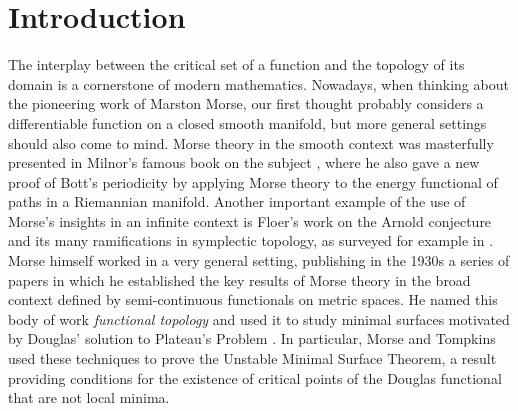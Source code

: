 
\section{Introduction}

The interplay between the critical set of a function and the topology of its domain is a cornerstone of modern mathematics.
Nowadays, when thinking about the pioneering work of Marston Morse, our first thought probably considers a differentiable function on a closed smooth manifold, but more general settings should also come to mind.
Morse theory in the smooth context was masterfully presented in Milnor's famous book on the subject \cite{MR0163331}, where he also gave a new proof of Bott's periodicity by applying Morse theory to the energy functional of paths in a Riemannian manifold.
Another important example of the use of Morse's insights in an infinite context is Floer's work on the Arnold conjecture and its many ramifications in symplectic topology, as surveyed for example in \cite{MR1702944}.
Morse himself worked in a very general setting, publishing in the 1930s a series of papers \cite{Morse.1937, Morse.1938, Morse.1940, MR9102} in which he established the key results of Morse theory in the broad context defined by semi-continuous functionals on metric spaces.
He named this body of work \emph{functional topology} and used it to study minimal surfaces motivated by Douglas' solution to Plateau’s Problem \cite{Douglas.1931}.
In particular, Morse and Tompkins \cite{Morse.1939, Morse.1941} used these techniques to prove the Unstable Minimal Surface Theorem, a result providing conditions for the existence of critical points of the Douglas functional that are not local minima.

